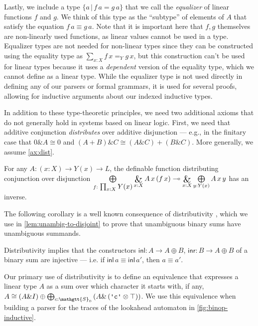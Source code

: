 \documentclass[acmsmall,nonacm]{acmart}
\renewcommand{\Sigma}{\mathgtt{S}}
\newcommand{\inl}{\mathsf{inl}}
\newcommand{\inr}{\mathsf{inr}}
\newcommand{\lto}{\multimap}
\DeclareMathOperator*{\bigwith}{\scalerel*{\&}{\bigoplus}}
\newcommand{\literal}[1]{\texttt{\textquotesingle#1\textquotesingle}}
\newcommand{\letin}[3]{\mathsf{let}\, #1 = #2 \, \mathsf{in}\, #3}
\newcommand{\lamblto}[2]{\lambda^{{\lto}} #1.\, #2}
\newcommand{\withlamb}[2]{{\lambda}^{{\&}} #1.\, #2}
\newcommand{\applto}[2]{#1 \, #2}
\newcommand{\PiTy}[3]{\textstyle\prod_{#1 : #2} #3}
\newcommand{\LinPiTyLimit}[3]{\bigwith\limits_{#1 : #2} #3}
\newcommand{\LinSigTy}[3]{\textstyle\bigoplus_{#1 : #2} #3}
\newcommand{\LinSigTyLimit}[3]{\bigoplus\limits_{#1 : #2} #3}
\newcommand{\equalizer}[3]{\{#1\,|\,\applto {#2}{#1} = \applto{#3}{#1} \}}
\begin{document}
Lastly, we include a type $\equalizer {a}{f}{g}$ that we call the
\emph{equalizer} of linear functions $f$ and $g$. We think of this
type as the ``subtype'' of elements of $A$ that satisfy the equation
$f\,a\equiv g\,a$. Note that it is important here that $f, g$
themselves are non-linearly used functions, as linear values cannot be
used in a type.  Equalizer types are not needed for non-linear types
since they can be constructed using the equality type as $\sum_{x:X}
f\,x=_Y g\,x$, but this construction can't be used for linear types
because it uses a \emph{dependent} version of the equality type, which
we cannot define as a linear type. While the equalizer type is not
used directly in defining any of our parsers or formal grammars, it is
used for several proofs, allowing for inductive arguments about our
indexed inductive types.

In addition to these type-theoretic principles, we need two additional
axioms that do not generally hold in systems based on linear
logic. First, we need that additive conjunction \emph{distributes}
over additive disjunction --- e.g., in the finitary case that $0 \& A
\cong 0$ and $(A + B) \& C \cong (A \& C) + (B \& C)$. More generally, we assume
\cref{ax:dist}.

\begin{axiom}[Distributivity]
\label{ax:dist}
For any $A : (x : X) \to Y(x) \to L$, the definable function distributing
conjunction over disjunction
\(\LinSigTyLimit{f}{\PiTy{x}{X}{Y(x)}}{\LinPiTyLimit{x}{X}{A\,x\,(f\,x)}} \lto
\LinPiTyLimit{x}{X}{\LinSigTyLimit{y}{Y(x)}{A\,x\,y}}
\)
has an inverse.
\end{axiom}

The following corollary is a well known consequence of distributivity \cite{Cockett_1993}, which we use in \cref{lem:unambig-to-disjoint} to prove that unambiguous binary sums have unambiguous summands.
\begin{corollary}
  \label{cor:binary-mono}
  Distributivity implies that the constructors $\inl : A \to A \oplus B$,
  $\inr : B \to A \oplus B$ of a binary sum are injective --- i.e. if
  $\inl\,a \equiv \inl\,a'$, then $a \equiv a'$.
\end{corollary}

Our primary use of distributivity is to define an equivalence that
expresses a linear type $A$ as a sum over which character it starts with, if any,
\(
A \cong \left(A \& I \right) \oplus \LinSigTy{c}{\Sigma_0}{\left( A \& \left( \literal{c} \otimes \top \right) \right)}
\). We use this equivalence when building a parser for the traces of the lookahead
automaton in \cref{fig:binop-inductive}.
\end{document}
